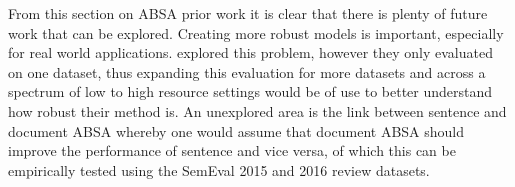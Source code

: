 From this section on ABSA prior work it is clear that there is plenty of future work that can be explored. Creating more robust models is important, especially for real world applications. \citet{bao-etal-2019-attention} explored this problem, however they only evaluated on one dataset, thus expanding this evaluation for more datasets and across a spectrum of low to high resource settings would be of use to better understand how robust their method is. An unexplored area is the link between sentence and document ABSA whereby one would assume that document ABSA should improve the performance of sentence and vice versa, of which this can be empirically tested using the SemEval 2015 \citep{pontiki-etal-2015-semeval} and 2016 \citep{pontiki-etal-2016-semeval} review datasets.







